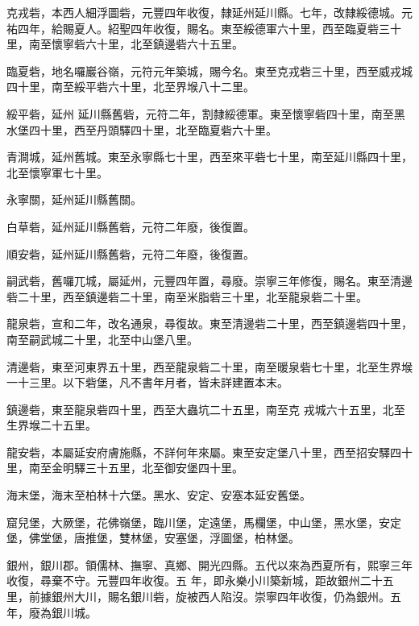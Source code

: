 \begin{pinyinscope}
 克戎砦，本西人細浮圖砦，元豐四年收復，隸延州延川縣。七年，改隸綏德城。元祐四年，給賜夏人。紹聖四年收復，賜名。東至綏德軍六十里，西至臨夏砦三十里，南至懷寧砦六十里，北至鎮邊砦六十五里。



 臨夏砦，地名囉巖谷嶺，元符元年築城，賜今名。東至克戎砦三十里，西至威戎城四十里，南至綏平砦六十里，北至界堠八十二里。



 綏平砦，延州
 延川縣舊砦，元符二年，割隸綏德軍。東至懷寧砦四十里，南至黑水堡四十里，西至丹頭驛四十里，北至臨夏砦六十里。



 青澗城，延州舊城。東至永寧縣七十里，西至來平砦七十里，南至延川縣四十里，北至懷寧軍七十里。



 永寧關，延州延川縣舊關。



 白草砦，延州延川縣舊砦，元符二年廢，後復置。



 順安砦，延州延川縣舊砦，元符二年廢，後復置。



 嗣武砦，舊囉兀城，屬延州，元豐四年置，尋廢。崇寧三年修復，賜名。東至清邊砦二十里，西至鎮邊砦二十里，南至米脂砦三十里，北至龍泉砦二十里。



 龍泉砦，宣和二年，改名通泉，尋復故。東至清邊砦二十里，西至鎮邊砦四十里，南至嗣武城二十里，北至中山堡八里。



 清邊砦，東至河東界五十里，西至龍泉砦二十里，南至暖泉砦七十里，北至生界堠一十三里。以下砦堡，凡不書年月者，皆未詳建置本末。



 鎮邊砦，東至龍泉砦四十里，西至大蟲坑二十五里，南至克
 戎城六十五里，北至生界堠二十五里。



 龍安砦，本屬延安府膚施縣，不詳何年來屬。東至安定堡八十里，西至招安驛四十里，南至金明驛三十五里，北至御安堡四十里。



 海末堡，海末至柏林十六堡。黑水、安定、安塞本延安舊堡。



 窟兒堡，大厥堡，花佛嶺堡，臨川堡，定遠堡，馬欄堡，中山堡，黑水堡，安定堡，佛堂堡，唐推堡，雙林堡，安塞堡，浮圖堡，柏林堡。



 銀州，銀川郡。領儒林、撫寧、真鄉、開光四縣。五代以來為西夏所有，熙寧三年收復，尋棄不守。元豐四年收復。五
 年，即永樂小川築新城，距故銀州二十五里，前據銀州大川，賜名銀川砦，旋被西人陷沒。崇寧四年收復，仍為銀州。五年，廢為銀川城。




\end{pinyinscope}
